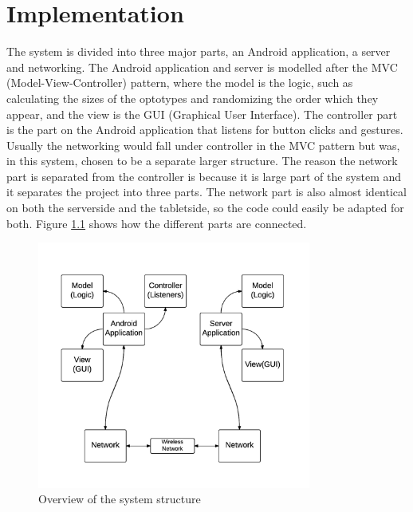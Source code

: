 \documentclass[12pt,a4paper,notitlepage]{report}
\begin{document}
\chapter{ Implementation}%
The system is divided into three major parts, an Android application, a server and networking. The Android application and server is modelled after the MVC (Model-View-Controller) pattern, where the model is the logic, such as calculating the sizes of the optotypes and randomizing the order which they appear, and the view is the GUI (Graphical User Interface). The controller part is the part on the Android application that listens for button clicks and gestures. Usually the networking would fall under controller in the MVC pattern but was, in this system, chosen to be a separate larger structure. The reason the network part is separated from the controller is because it is large part of the system and it separates the project into three parts. The network part is also almost identical on both the serverside and the tabletside, so the code could easily be adapted for both. Figure \ref{system_structure} shows how the different parts are connected.

\begin{figure}[ht!]
\centering
\includegraphics[width=90mm]{images/system_structure.png}
\caption{Overview of the system structure\label{system_structure}}
\end{figure}
\end{document}
